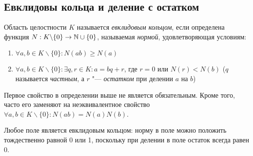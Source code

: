 \subsection{Евклидовы кольца и деление с остатком}

\begin{definition}
	Область целостности $K$ называется \textit{евклидовым кольцом}, если определена функция $N: K\backslash\{0\} \to \mathbb{N} \cup \{0\}$, называемая \textit{нормой}, удовлетворяющая условиям:
	\begin{enumerate}
		\item $\forall a, b \in K\backslash\{0\}: N(ab) \ge N(a)$
		\item $\forall a, b \in K\backslash\{0\}: \exists q, r \in K: a = bq + r$, где $r = 0$ или $N(r) < N(b)$ ($q$ называется \textit{частным}, а $r$ "--- \textit{остатком} при делении $a$ на $b$)
	\end{enumerate}
\end{definition}

\begin{note}
	Первое свойство в определении выше не является обязательным. Кроме того, часто его заменяют на неэквивалентное свойство $\forall a, b \in K \backslash \{0\}: N(ab) = N(a)N(b)$.
\end{note}

\begin{note}
	Любое поле является евклидовым кольцом: норму в поле можно положить тождественно равной 0 или 1, поскольку при делении в поле остаток всегда равен $0$.
\end{note}

